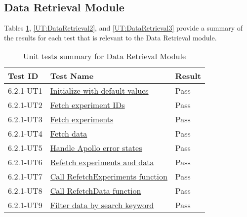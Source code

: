 \documentclass[12pt, titlepage]{article}
\begin{document}
\subsection{Data Retrieval Module}
Tables \ref{UT:DataRetrieval1}, \ref{UT:DataRetrieval2}, and \ref{UT:DataRetrieval3} provide a summary of
the results for each test that is relevant to the Data Retrieval module.
\begin{table}[H]
  \centering
  \begin{tabular}{|l|l|l|}
    \hline
    \textbf{Test ID} & \textbf{Test Name} & \textbf{Result}\\
    \hline
    6.2.1-UT1 &
    \href{https://github.com/SumanyaG/Alkalytics/blob/main/src/frontend/test/hooks/useTable.test.tsx}{Initialize
    with default values} & Pass \\
    \hline
    6.2.1-UT2 &
    \href{https://github.com/SumanyaG/Alkalytics/blob/main/src/frontend/test/hooks/useTable.test.tsx}{Fetch
    experiment IDs} & Pass \\
    \hline
    6.2.1-UT3 &
    \href{https://github.com/SumanyaG/Alkalytics/blob/main/src/frontend/test/hooks/useTable.test.tsx}{Fetch
    experiments} & Pass \\
    \hline
    6.2.1-UT4 &
    \href{https://github.com/SumanyaG/Alkalytics/blob/main/src/frontend/test/hooks/useTable.test.tsx}{Fetch
    data} & Pass \\
    \hline
    6.2.1-UT5 &
    \href{https://github.com/SumanyaG/Alkalytics/blob/main/src/frontend/test/hooks/useTable.test.tsx}{Handle
    Apollo error states} & Pass \\
    \hline
    6.2.1-UT6 &
    \href{https://github.com/SumanyaG/Alkalytics/blob/main/src/frontend/test/hooks/useTable.test.tsx}{Refetch
    experiments and data} & Pass \\
    \hline
    6.2.1-UT7 &
    \href{https://github.com/SumanyaG/Alkalytics/blob/main/src/frontend/test/hooks/useTable.test.tsx}{Call
    RefetchExperiments function} & Pass \\
    \hline
    6.2.1-UT8 &
    \href{https://github.com/SumanyaG/Alkalytics/blob/main/src/frontend/test/hooks/useTable.test.tsx}{Call
    RefetchData function} & Pass \\
    \hline
    6.2.1-UT9 &
    \href{https://github.com/SumanyaG/Alkalytics/blob/main/src/frontend/test/hooks/TableHeader.test.tsx}{Filter
    data by search keyword} & Pass \\
    \hline
  \end{tabular}
  \caption{Unit tests summary for Data Retrieval Module}
  \label{UT:DataRetrieval1}
\end{table}
\end{document}
